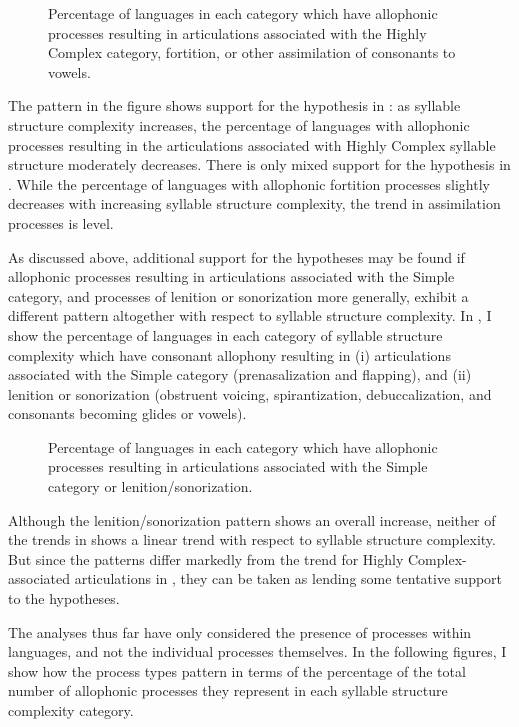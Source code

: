 \begin{figure}
\caption{\label{fig:7.2} Percentage of languages in each category which have allophonic processes resulting in articulations associated with the Highly Complex category, fortition, or other assimilation of consonants to vowels.}
\end{figure}

  The pattern in the figure shows support for the hypothesis in : as syllable structure complexity increases, the percentage of languages with allophonic processes resulting in the articulations associated with Highly Complex syllable structure moderately decreases. There is only mixed support for the hypothesis in . While the percentage of languages with allophonic fortition processes slightly decreases with increasing syllable structure complexity, the trend in assimilation processes is level.

  As discussed above, additional support for the hypotheses may be found if allophonic processes resulting in articulations associated with the Simple category, and processes of lenition or sonorization more generally, exhibit a different pattern altogether with respect to syllable structure complexity. In , I show the percentage of languages in each category of syllable structure complexity which have consonant allophony resulting in (i) articulations associated with the Simple category (prenasalization and flapping), and (ii) lenition or sonorization (obstruent voicing, spirantization, debuccalization, and consonants becoming glides or vowels).

\begin{figure}
\caption{\label{fig:7.3} Percentage of languages in each category which have allophonic processes resulting in articulations associated with the Simple category or lenition/sonorization.}
\end{figure}
  Although the lenition/sonorization pattern shows an overall increase, neither of the trends in  shows a linear trend with respect to syllable structure complexity. But since the patterns differ markedly from the trend for Highly Complex-associated articulations in , they can be taken as lending some tentative support to the hypotheses.

  The analyses thus far have only considered the presence of processes within languages, and not the individual processes themselves. In the following figures, I show how the process types pattern in terms of the percentage of the total number of allophonic processes they represent in each syllable structure complexity category.

